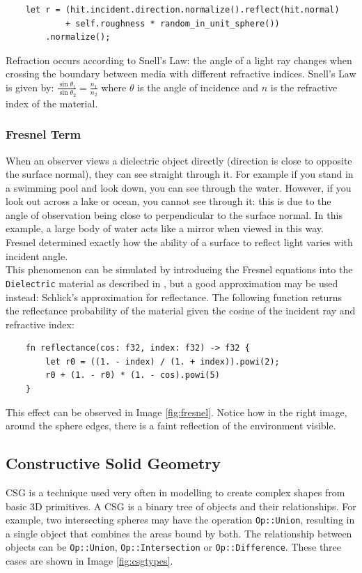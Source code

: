 \documentclass[a4paper]{article}
\begin{document}
\begin{verbatim}
    let r = (hit.incident.direction.normalize().reflect(hit.normal)
            + self.roughness * random_in_unit_sphere())
        .normalize();
\end{verbatim}

Refraction occurs according to Snell's Law: the angle of a light ray changes when crossing the boundary between media with different refractive indices. Snell's Law is given by: $\frac{\sin \theta_{1}}{\sin \theta_{2}} = \frac{n_{1}}{n_{2}}$ where $\theta$ is the angle of incidence and $n$ is the refractive index of the material.

\subsubsection{Fresnel Term} When an observer views a dielectric object directly (direction is close to opposite the surface normal), they can see straight through it. For example if you stand in a swimming pool and look down, you can see through the water. However, if you look out across a lake or ocean, you cannot see through it: this is due to the angle of observation being close to perpendicular to the surface normal. In this example, a large body of water acts like a mirror when viewed in this way. Fresnel determined exactly how the ability of a surface to reflect light varies with incident angle.\\

This phenomenon can be simulated by introducing the Fresnel equations into the \texttt{Dielectric} material as described in \cite{Suffern2016ray}, but a good approximation may be used instead: Schlick's approximation \cite{Schlick1994approx} for reflectance. The following function returns the reflectance probability of the material given the cosine of the incident ray and refractive index:

\begin{verbatim}
    fn reflectance(cos: f32, index: f32) -> f32 {
        let r0 = ((1. - index) / (1. + index)).powi(2);
        r0 + (1. - r0) * (1. - cos).powi(5)
    }
\end{verbatim}

This effect can be observed in Image \ref{fig:fresnel}. Notice how in the right image, around the sphere edges, there is a faint reflection of the environment visible.

\subsection{Constructive Solid Geometry}
CSG is a technique used very often in modelling to create complex shapes from basic 3D primitives. A CSG is a binary tree of objects and their relationships. For example, two intersecting spheres may have the operation \texttt{Op::Union}, resulting in a single object that combines the areas bound by both. The relationship between objects can be \texttt{Op::Union}, \texttt{Op::Intersection} or \texttt{Op::Difference}. These three cases are shown in Image \ref{fig:csgtypes}.
\end{document}
